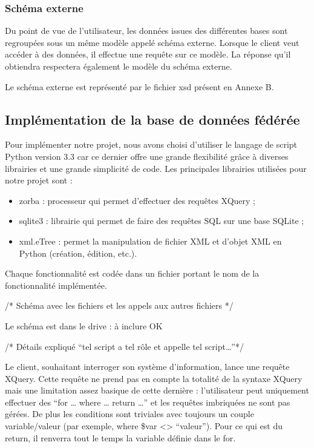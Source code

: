  \subsubsection{Schéma externe}

Du point de vue de l’utilisateur, les données issues des différentes bases sont regroupées sous un même modèle appelé schéma externe. Lorsque le client veut accéder à des données, il effectue une requête sur ce modèle. La réponse qu’il obtiendra respectera également le modèle du schéma externe.

Le schéma externe est représenté par le fichier xsd présent en Annexe B.

\subsection{Implémentation de la base de données fédérée}

Pour implémenter notre projet, nous avons choisi d’utiliser le langage de script Python version 3.3 car ce dernier offre une grande flexibilité grâce à diverses librairies et une grande simplicité de code. Les principales librairies utilisées pour notre projet sont :

\begin{itemize}
    \item zorba : processeur qui permet d’effectuer des requêtes XQuery ;

    \item sqlite3 : librairie qui permet de faire des requêtes SQL sur une base SQLite ;

    \item xml.eTree : permet la manipulation de fichier XML et d’objet XML en Python (création, édition, etc.).
\end{itemize}

Chaque fonctionnalité est codée dans un fichier portant le nom de la fonctionnalité implémentée.

/* Schéma avec les fichiers et les appels aux autres fichiers */

Le schéma est dans le drive : à inclure OK

/* Détails expliqué “tel script a tel rôle et appelle tel script…”*/

Le client, souhaitant interroger son système d’information, lance une requête XQuery. Cette requête ne prend pas en compte la totalité de la syntaxe XQuery mais une limitation assez basique de cette dernière : l’utilisateur peut uniquement effectuer des “for … where … return …” et les requêtes imbriquées ne sont pas gérées. De plus les conditions sont triviales avec toujours un couple variable/valeur (par exemple, where \$var <> “valeur”). Pour ce qui est du return, il renverra tout le temps la variable définie dans le for.

